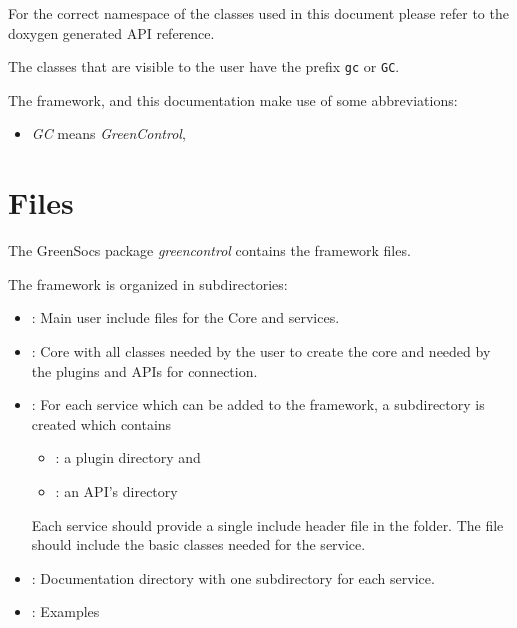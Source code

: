 
For the correct namespace of the classes used in this document please
refer to the doxygen generated API reference.

The classes that are visible to the user have the prefix \lstinline|gc| or \lstinline|GC|.

The \GreenControl framework, and this  documentation make use of some abbreviations:
\begin{itemize}
	\item \emph{GC} means \emph{GreenControl},
\end{itemize}


\section{Files}
\label{GreenControlFiles}
The GreenSocs package \emph{greencontrol} contains the framework files.

The framework is organized in subdirectories:
\begin{itemize}

  \item {}:\newline
  	Main user include files for the Core and services.

  \item {}:\newline
  	\GreenControl Core with all classes needed by the user to create the core and needed by the plugins and APIs for connection.

  \item {}: \newline
  	For each service which can be added to the framework, a subdirectory is created which contains 
    \begin{itemize}
      \item {}: a plugin directory and 
      \item {}: an API's directory
    \end{itemize}
    Each service should provide a single include header file in the  folder. The file should include the basic classes needed for the service.

  \item {}: \newline
  	Documentation directory with one subdirectory for each service.

  \item {}: \newline
  	Examples

\end{itemize}

